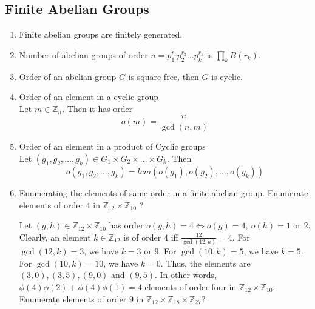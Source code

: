 \subsection{Finite Abelian Groups}
\begin{enumerate}
	\item Finite abelian groups are finitely generated.
	\item Number of abelian groups of order $n = p_1^{r_1}p_2^{r_2}\dots p_k^{r_k}$ is $\prod_k B(r_k)$.
	\item Order of an abelian group $G$ is square free, then $G$ is cyclic.
	\item Order of an element in a cyclic group\\
	Let $m \in \mathbb{Z}_n$.
	Then it has order $$o(m) = \frac{n}{\gcd(n,m)}$$
	\item Order of an element in a product of Cyclic groups\\
	Let $(g_1,g_2,\dots,g_k) \in G_1 \times G_2 \times \dots \times G_k$. Then 
	$$o(g_1,g_2,\dots,g_k) = lcm(o(g_1),o(g_2),\dots,o(g_k))$$
	\item Enumerating the elements of same order in a finite abelian group.
	\subitem Enumerate elements of order $4$ in $\mathbb{Z}_{12} \times \mathbb{Z}_{10}$ ? 

	Let $(g,h) \in \mathbb{Z}_{12} \times \mathbb{Z}_{10}$ has order $o(g,h)= 4 \iff o(g)=4,\ o(h) = 1 \text{ or } 2$. Clearly, an element $k \in \mathbb{Z}_{12}$ is of order $4$ iff $\frac{12}{\gcd(12,k)}=4$. For $\gcd(12,k)=3$, we have $k = 3$ or $9$. For $\gcd(10,k)=5$, we have $k=5$. For $\gcd(10,k)=10$, we have $k=0$. Thus, the elements are $(3,0),(3,5),(9,0)$ and $(9,5)$.  
	In other words, $\phi(4)\phi(2)+\phi(4)\phi(1)=4$ elements of order four in $\mathbb{Z}_{12} \times \mathbb{Z}_{10}$.
	\subitem Enumerate elements of order $9$ in $\mathbb{Z}_{12} \times \mathbb{Z}_{18} \times \mathbb{Z}_{27}$?


\end{enumerate}
